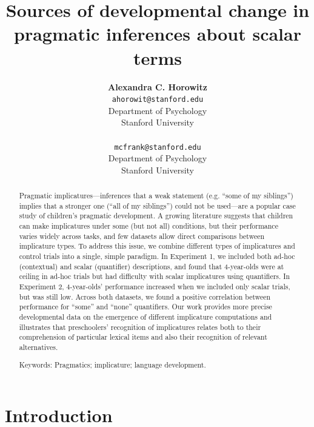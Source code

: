 \documentclass[10pt,letterpaper]{article}
\title{Sources of developmental change in pragmatic inferences about scalar terms}
\author{{\large \bf Alexandra C. Horowitz} \\ \texttt{ahorowit@stanford.edu}\\ Department of Psychology \\ Stanford University \\ 
\And {\large \bf Michael C. Frank} \\ \texttt{mcfrank@stanford.edu} \\ Department of Psychology \\ Stanford University \\ }
\begin{document}
\maketitle

\begin{abstract} 

Pragmatic implicatures---inferences that a weak statement (e.g. ``some of my siblings'') implies that a stronger one (``all of my siblings'') could not be used---are a popular case study of children's pragmatic development. A growing literature suggests that children can make implicatures under some (but not all) conditions, but their performance varies widely across tasks, and few datasets allow direct comparisons between implicature types. To address this issue, we combine different types of implicatures and control trials into a single, simple paradigm. In Experiment 1, we included both ad-hoc (contextual) and scalar (quantifier) descriptions, and found that 4-year-olds were at ceiling in ad-hoc trials but had difficulty with scalar implicatures using quantifiers.  In Experiment 2, 4-year-olds' performance increased when we included only scalar trials, but was still low. Across both datasets, we found a positive correlation between performance for ``some'' and ``none'' quantifiers. Our work provides more precise developmental data on the emergence of different implicature computations and illustrates that preschoolers' recognition of implicatures relates both to their comprehension of particular lexical items and also their recognition of relevant alternatives. 


{Keywords:} Pragmatics; implicature; language development. 
\end{abstract}

\section{Introduction}
\end{document}
